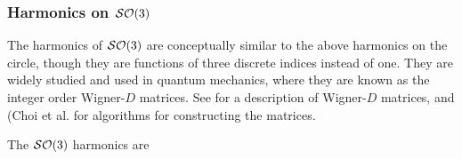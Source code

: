 \documentclass[../main.tex]{subfiles}
\begin{document}
\begin{refsection}

\subsubsection{\texorpdfstring{Harmonics on $\mathcal{SO}(3)$}{Harmonics on \textbackslash SO\{3\}}}\label{harmonics-on-so3}

The harmonics of $\mathcal{SO}(3)$ are conceptually similar to the above harmonics on the circle, though they are functions of three discrete indices instead of one.
They are widely studied and used in quantum mechanics, where they are known as the integer order Wigner-$D$ matrices.
See \cite{varshalovich_wigner_1988} for a description of Wigner-$D$ matrices, and (Choi et al. \cite{choi_rapid_1999,boyle_angular_2013} for algorithms for constructing the matrices.

The $\mathcal{SO}(3)$ harmonics are \footnotemark {}



\end{refsection}
\end{document}

